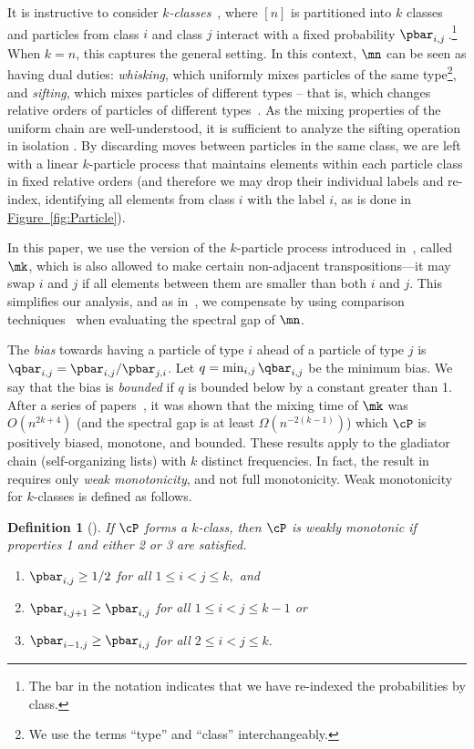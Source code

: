 \documentclass[11pt]{article}
\newtheorem{definition}[theorem]{Definition}
\providecommand{\expref}[2]{\texorpdfstring{\hyperref[#2]{#1~\ref{#2}}}{#1~\ref{#2}}}
\begin{document}
It is instructive to consider \emph{$k$-classes}~\cite{MS}, where $[n]$ 
is partitioned into $k$ classes and particles from class $i$ and class 
$j$ interact with a fixed probability
%
%
$\pbar_{i,j}\,$.\footnote{The bar in   %
the notation indicates that we have re-indexed the probabilities by 
class.} %
When $k=n$, this captures the general setting. In this 
context, $\mn$ can be seen as having dual duties: \emph{whisking}, 
which uniformly mixes particles of the same type\footnote{We use the 
terms ``type'' and ``class'' interchangeably.}, and \emph{sifting}, 
which mixes particles of different types %
-- that is, which changes relative orders of particles of different types~\cite{HW16}. %
%
As the mixing properties of the uniform chain are well-understood, it is 
sufficient to analyze the sifting operation in
%
%
isolation \cite{HW16, MS}.  %
By discarding moves between particles in the same class, we are 
left with a linear $k$-particle process that maintains elements within 
each particle class in fixed relative orders (and therefore we may drop 
their individual labels and re-index, identifying all elements from 
class $i$ with the label $i$, as is done in \expref{Figure}{fig:Particle}).

In this paper, we use the version of the $k$-particle process 
introduced in~\cite{MS}, called $\mk$, which is also allowed to make 
certain non-adjacent transpositions---it may swap $i$ and $j$ if all 
elements between them are smaller than both $i$ and $j$.  This 
simplifies our analysis, and as in~\cite{MS}, we compensate by using 
comparison techniques~\cite{dsc, RT98} when evaluating the spectral gap 
of $\mn$.
 
The \emph{bias} towards having a particle of type $i$ ahead of a 
particle of type $j$ is $\qbar_{i,j} = \pbar_{i,j}/\pbar_{j,i}$.  Let 
$q=\min_{i,j}\qbar_{i,j}$ be the minimum bias. We say that the bias is 
\emph{bounded} if $q$ is bounded below by a constant greater than 1. 
After a series of papers~\cite{HW16,MS}, it was shown that the mixing time
of $\mk$ was $O(n^{2k+4})$ (and the spectral 
gap is at least $\Omega(n^{-2(k-1)})$) 
which $\cP$ is positively biased, monotone, and bounded. %
%
%
%
%
%
%
These results apply to the 
gladiator chain (self-organizing lists) with $k$ distinct frequencies.  
In fact, the result in~\cite{MS} requires only \emph{weak 
monotonicity}, and not full monotonicity.  Weak monotonicity for 
$k$-classes is defined as follows.

\begin{definition}[\cite{bmrs}] If $\cP$ forms a $k$-class, 
then $\cP$ is weakly monotonic if properties 1 and either 2 or 3 are satisfied.
\begin{enumerate}
\item $\pbar_{i,j} \geq 1/2$ for all $1 \leq i < j \leq k,$ and
\item $\pbar_{i,j+1} \geq \pbar_{i,j}$ for all $1 \leq i < j \leq k-1$ or
\item $\pbar_{i-1,j} \geq \pbar_{i,j}$ for all $2 \leq i < j \leq k.$
\end{enumerate}
\end{definition}
\end{document}
